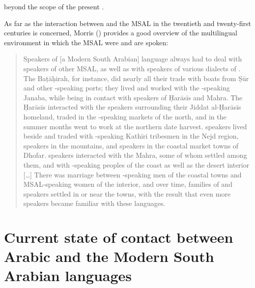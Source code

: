 \documentclass[output=paper]{langsci/langscibook}
\begin{document}
beyond the scope of the present .

As far as the interaction between  and the MSAL in the twentieth and twenty-first centuries is concerned, Morris (\citeyear[25]{Morris2017}) provides a good overview of the multilingual environment in which the MSAL were and are spoken:\largerpage[-1]

\begin{quote}
Speakers of [a Modern South Arabian] language always had to deal with speakers of other MSAL, as well as with speakers of various dialects of . The Baṭāḥirah, for instance, did nearly all their trade with boats from Ṣūr and other -speaking ports; they lived and worked with the -speaking Janaba, while being in contact with speakers of Ḥarāsīs and Mahra. The Ḥarāsīs interacted with the  speakers surrounding their Jiddat al-Ḥarāsīs homeland, traded in the -speaking markets of the north, and in the summer months went to work at the northern date harvest.  speakers lived beside and traded with -speaking Kathīri tribesmen in the Nejd region,  speakers in the mountains, and  speakers in the coastal market towns of Dhofar.  speakers interacted with the Mahra, some of whom settled among them, and with -speaking peoples of the coast as well as the desert interior […] There was marriage between -speaking men of the coastal towns and MSAL-speaking women of the interior, and over time, families of  and  speakers settled in or near the towns, with the result that even more  speakers became familiar with these languages. \citep[25]{Morris2017}
\end{quote}

\section{Current state of contact between Arabic and the Modern South Arabian languages}\label{sec:2}
\end{document}
